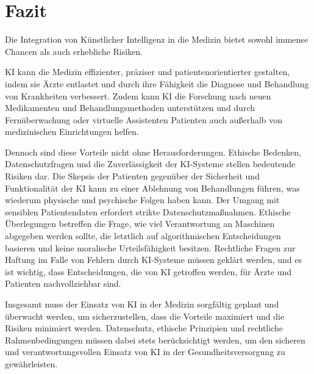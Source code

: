 \chapter{Fazit}
\label{chap:Fazit}

Die Integration von Künstlicher Intelligenz in die Medizin bietet sowohl immense Chancen als auch erhebliche Risiken. 

KI kann die Medizin effizienter, präziser und patientenorientierter gestalten, indem sie Ärzte entlastet und durch ihre Fähigkeit die Diagnose und Behandlung von Krankheiten verbessert. 
Zudem kann KI die Forschung nach neuen Medikamenten und Behandlungsmethoden unterstützen und durch Fernüberwachung oder virtuelle Assistenten Patienten auch außerhalb von medizinischen Einrichtungen helfen.

Dennoch sind diese Vorteile nicht ohne Herausforderungen. Ethische Bedenken, Datenschutzfragen und die Zuverlässigkeit der KI-Systeme stellen bedeutende Risiken dar. 
Die Skepsis der Patienten gegenüber der Sicherheit und Funktionalität der KI kann zu einer Ablehnung von Behandlungen führen, was wiederum physische und psychische Folgen haben kann. 
Der Umgang mit sensiblen Patientendaten erfordert strikte Datenschutzmaßnahmen.
Ethische Überlegungen betreffen die Frage, wie viel Verantwortung an Maschinen abgegeben werden sollte, die letztlich auf algorithmischen Entscheidungen basieren und keine moralische Urteilsfähigkeit besitzen. 
Rechtliche Fragen zur Haftung im Falle von Fehlern durch KI-Systeme müssen geklärt werden, und es ist wichtig, dass Entscheidungen, die von KI getroffen werden, für Ärzte und Patienten nachvollziehbar sind.

\vspace{5mm} \noindent
Insgesamt muss der Einsatz von KI in der Medizin sorgfältig geplant und überwacht werden, um sicherzustellen, dass die Vorteile maximiert und die Risiken minimiert werden. 
Datenschutz, ethische Prinzipien und rechtliche Rahmenbedingungen müssen dabei stets berücksichtigt werden, um den sicheren und verantwortungsvollen Einsatz von KI in der Gesundheitsversorgung zu gewährleisten.
